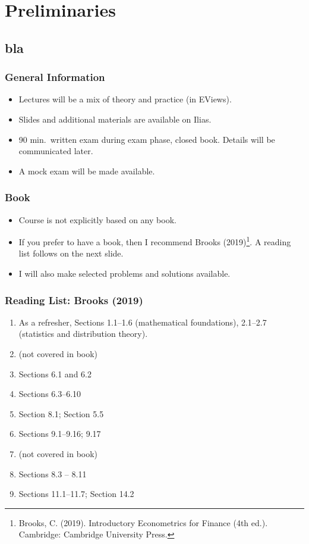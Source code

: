 

\frame{\titlepage}


\section{Preliminaries}\subsection*{bla}
\begin{frame}
\frametitle{General Information}
\begin{itemize}
\item Lectures will be a mix of theory and practice (in EViews).
\item Slides and additional materials are available on Ilias.
\item 90 min.\ written exam during exam phase, closed book. Details will be communicated later.
\item A mock exam will be made available.
\end{itemize}
\end{frame}
\begin{frame}
\frametitle{Book}
\begin{itemize}
\item Course is not explicitly based on any book.
\item If you prefer to have a book, then I recommend Brooks (2019)\footnote{Brooks, C. (2019). Introductory Econometrics for Finance (4th ed.). Cambridge: Cambridge University Press.}. A reading list follows on the next slide.
\item I will also make selected problems and solutions available.
\end{itemize}
\end{frame}
\begin{frame}
\frametitle{Reading List: Brooks (2019)}

\begin{enumerate}
\item[Pre] As a refresher, Sections 1.1--1.6 (mathematical foundations), 2.1--2.7 (statistics and distribution theory).
\item[Week 1] (not covered in book)
\item[Week 2] Sections 6.1 and 6.2
\item[Week 3] Sections 6.3--6.10
\item[Week 4] Section 8.1; Section 5.5
\item[Week 5] Sections 9.1--9.16; 9.17
\item[Week 6] (not covered in book)
\item[Week 7] Sections 8.3 -- 8.11
\item[Week 7] Sections 11.1--11.7; Section 14.2

\end{enumerate}
\end{frame}
